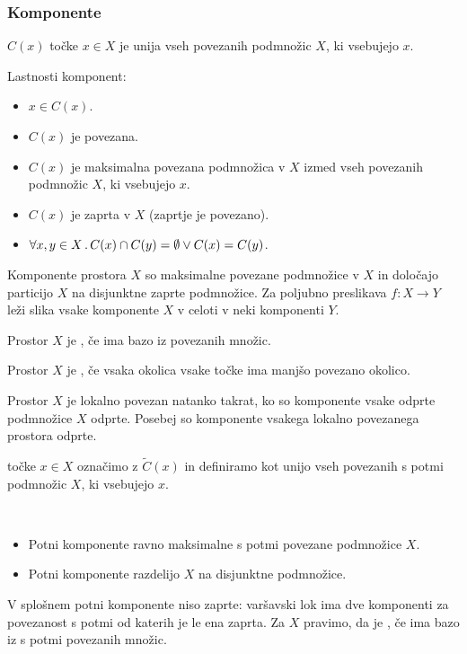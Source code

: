 \subsubsection{Komponente}
\begin{definicija}
     $C(x)$ točke $x \in X$ je unija vseh povezanih podmnožic $X$, ki vsebujejo $x$.
\end{definicija}
\begin{trditev}
    Lastnosti komponent:
    \begin{itemize}
        \item $x \in C(x)$.
        \item $C(x)$ je povezana.
        \item $C(x)$ je maksimalna povezana podmnožica v $X$ izmed vseh povezanih podmnožic $X$, ki vsebujejo $x$.
        \item $C(x)$ je zaprta v $X$ (zaprtje je povezano).
        \item $\forall x, y \in X \,.\, C(x) \cap C(y) = \emptyset \lor C(x) = C(y)$.
    \end{itemize}
\end{trditev}

\begin{izrek}
    Komponente prostora $X$ so maksimalne povezane podmnožice v $X$ in določajo particijo $X$ na disjunktne zaprte podmnožice. Za poljubno preslikava $f: X \to Y$ leži slika vsake komponente $X$ v celoti v neki komponenti $Y$.
\end{izrek}

\begin{definicija}
    Prostor $X$ je , če ima bazo iz povezanih množic.
\end{definicija}

\begin{opomba}
    Prostor $X$ je , če vsaka okolica vsake točke ima manjšo povezano okolico.
\end{opomba}

\begin{trditev}
    Prostor $X$ je lokalno povezan natanko takrat, ko so komponente vsake odprte podmnožice $X$ odprte. Posebej so komponente vsakega lokalno povezanega prostora odprte.
\end{trditev}

 točke $x \in X$ označimo z $\widetilde{C}(x)$ in definiramo kot unijo vseh povezanih s potmi podmnožic $X$, ki vsebujejo $x$.

\begin{opomba}
    \ 
    \begin{itemize}
        \item Potni komponente ravno maksimalne s potmi povezane podmnožice $X$.
        \item Potni komponente razdelijo $X$ na disjunktne podmnožice.
    \end{itemize}

    V splošnem potni komponente niso zaprte: varšavski lok ima dve komponenti za povezanost s potmi od katerih je le ena zaprta. Za $X$ pravimo, da je , če ima bazo iz s potmi povezanih množic.
\end{opomba}

